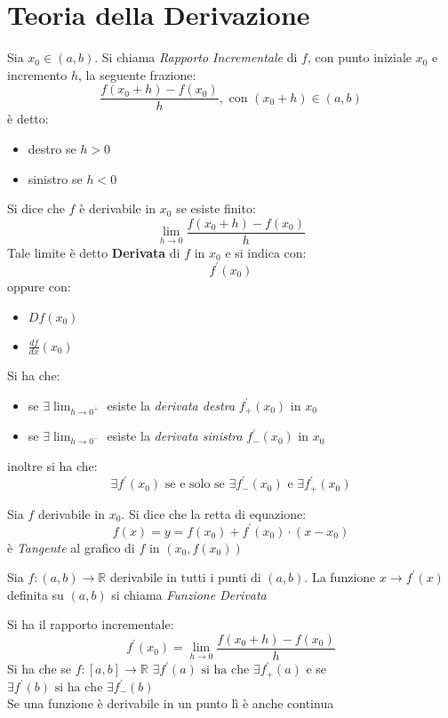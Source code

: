 \documentclass[a4paper,12pt, oneside]{book}
\begin{document}
\section{Teoria della Derivazione}
\begin{shaded}
	Sia $x_0\in(a,b)$. Si chiama \textit{Rapporto Incrementale} di $f$, con punto iniziale $x_0$ e incremento $h$, la seguente frazione:
	$$\frac{f(x_0+h)-f(x_0)}{h}, \mbox{ con } (x_0+h)\in (a,b)$$
	è detto:
	\begin{itemize}
		\item destro se $h>0$
		\item sinistro se $h<0$
	\end{itemize}
\end{shaded}
\begin{definizione}
	Si dice che $f$ è derivabile in $x_0$ se esiste finito:
	$$\lim_{h\rightarrow 0} \frac{f(x_0+h)-f(x_0)}{h}$$
	Tale limite è detto \textbf{Derivata} di $f$ in $x_0$ e si indica con:
	$$f^{'}(x_0)$$
	oppure con:
	\begin{itemize}
		\item $Df(x_0)$
		\item $\frac{df}{dx}(x_0)$
	\end{itemize}
	\newpage
	Si ha che:
	\begin{itemize}
		\item se $\exists \lim_{h\rightarrow 0^{+}}$ esiste la \textit{derivata destra} $f_{+}^{'}(x_0)$ in $x_0$
		\item se $\exists \lim_{h\rightarrow 0^{-}}$ esiste la \textit{derivata sinistra} $f_{-}^{'}(x_0)$ in $x_0$
	\end{itemize}
	inoltre si ha che:
	$$\exists f^{'}(x_0) \mbox{ se e solo se } \exists f_{-}^{'}(x_0) \mbox{ e } \exists f_{+}^{'}(x_0)$$
\end{definizione}
\begin{definizione}
	Sia $f$ derivabile in $x_0$. Si dice che la retta di equazione:
	$$f(x)=y=f(x_0)+f^{'}(x_0)\cdot (x-x_0)$$
	è \textit{Tangente} al grafico di $f$ in $(x_0,f(x_0))$
\end{definizione}
\begin{definizione}
	Sia $f:(a,b)\rightarrow \mathbb{R}$ derivabile in tutti i punti di $(a,b)$. La funzione $x\rightarrow f^{'}(x)$ definita su $(a,b)$ si chiama \textit{Funzione Derivata}
\end{definizione}
Si ha il rapporto incrementale: $$f^{'}(x_0)=\lim_{h\rightarrow 0}\frac{f(x_0+h)-f(x_0)}{h}$$
Si ha che se $f:[a,b]\rightarrow \mathbb{R}$ $\exists f^{'} (a) \mbox{ si ha che  }\exists f^{'}_{+} (a)$ e se $\exists f^{'} (b) \mbox{ si ha che }\exists f^{'}_{-} (b)$\\
Se una funzione è derivabile in un punto lì è anche continua
\end{document}
